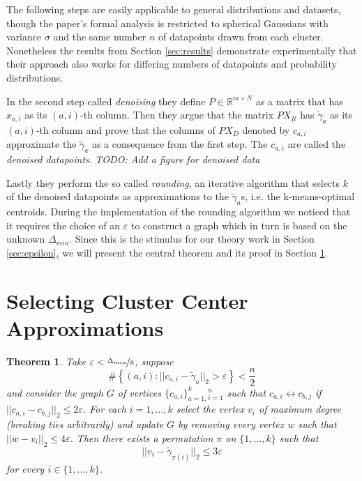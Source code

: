 \documentclass[10pt,a4paper]{article}
\newtheorem{theorem}{Theorem}
\begin{document}
The following steps are easily applicable to general distributions and datasets, though the paper's formal analysis is restricted to spherical Gaussians with variance $\sigma$ and the same number $n$ of datapoints drawn from each cluster.
Nonetheless the results from Section \ref{sec:results} demonstrate experimentally that their approach also works for differing numbers of datapoints and probability distributions.

In the second step called \emph{denoising} they define $P \in \mathbb{R}^{m \times N}$ as a matrix that has $x_{a, i}$ as its $(a, i)$-th column.
Then they argue that the matrix $PX_{R}$ has $\tilde{\gamma}_{a}$ as its $(a, i)$-th column and prove that the columns of $PX_{D}$ denoted by $c_{a, i}$ approximate the $\tilde{\gamma}_{a}$ as a consequence from the first step.
The $c_{a, i}$ are called the \emph{denoised datapoints}.
\emph{TODO: Add a figure for denoised data}

Lastly they perform the so called \emph{rounding}, an iterative algorithm that selects $k$ of the denoised datapoints as approximations to the $\tilde{\gamma}_{a}$s, i.e. the k-means-optimal centroids.
During the implementation of the rounding algorithm we noticed that it requires the choice of an $\varepsilon$ to construct a graph which in turn is based on the unknown $\Delta_{min}$.
Since this is the stimulus for our theory work in Section \ref{sec:epsilon}, we will present the central theorem and its proof in Section \ref{sec:rounding}.

\section{Selecting Cluster Center Approximations}
\label{sec:rounding}

\begin{theorem}
  \label{thm:rounding}
  Take $\varepsilon < \nicefrac{\Delta_{min}}{8}$, suppose
  \begin{equation*}
    \#\left\{ (a, i) : ||c_{a, i} - \tilde{\gamma}_{a}||_{2} > \varepsilon \right\} < \frac{n}{2}
  \end{equation*}
  and consider the graph $G$ of vertices $\{ c_{a, i} \}_{a = 1,}^{k}{}_{i = 1}^{n}$ such that $c_{a, i} \leftrightarrow c_{b, j}$ if $||c_{a, i} - c_{b, j}||_{2} \le 2\varepsilon$.
  For each $i = 1, \dots, k$ select the vertex $v_{i}$ of maximum degree (breaking ties arbitrarily) and update $G$ by removing every vertex $w$ such that $||w - v_{i}||_{2} \le 4\varepsilon$.
  Then there exists a permutation $\pi$ on $\{ 1, \dots, k \}$ such that
  \begin{equation*}
    ||v_{i} - \tilde{\gamma}_{\pi(i)}||_{2} \le 3\varepsilon
  \end{equation*}
  for every $i \in \{ 1, \dots, k \}$.
\end{theorem}
\end{document}
